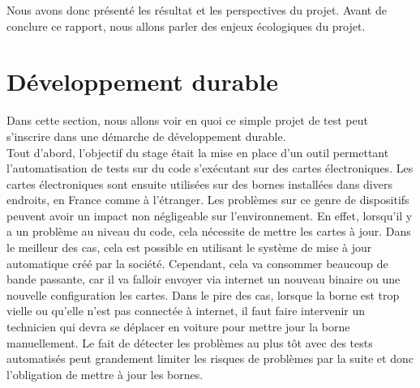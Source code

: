 \documentclass[a4paper]{article}
\begin{document}
Nous avons donc présenté les résultat et les perspectives du projet. Avant de
conclure ce rapport, nous allons parler des enjeux écologiques du projet.

\clearpage
\section{Développement durable}%

Dans cette section, nous allons voir en quoi ce simple projet de test peut
s'inscrire dans une démarche de développement durable.\\

Tout d'abord, l'objectif du stage était la mise en place d'un outil permettant
l'automatisation de tests sur du code s'exécutant sur des cartes électroniques.
Les cartes électroniques sont ensuite utilisées sur des bornes installées dans
divers endroits, en France comme à l'étranger. Les problèmes sur ce genre de
dispositifs peuvent avoir un impact non négligeable sur l'environnement. En
effet, lorsqu'il y a un problème au niveau du code, cela nécessite de mettre
les cartes à jour. Dans le meilleur des cas, cela est possible en utilisant le
système de mise à jour automatique créé par la société. Cependant, cela va
consommer beaucoup de bande passante, car il va falloir envoyer via internet un
nouveau binaire ou une nouvelle configuration les cartes. Dans le pire des cas,
lorsque la borne est trop vielle ou qu'elle n'est pas connectée à internet, il
faut faire intervenir un technicien qui devra se déplacer en voiture pour mettre
jour la borne manuellement. Le fait de détecter les problèmes au plus tôt avec
des tests automatisés peut grandement limiter les risques de problèmes par la
suite et donc l'obligation de mettre à jour les bornes.
\end{document}
